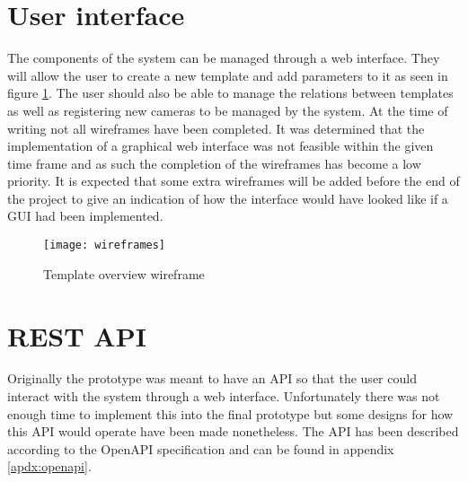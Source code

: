 \section{User interface}
The components of the system can be managed through a web interface.
They will allow the user to create a new template and add parameters to it as seen in figure \ref{fig:templatewireframe}.
The user should also be able to manage the relations between templates as well as registering new cameras to be managed by the system.
At the time of writing not all wireframes have been completed.
It was determined that the implementation of a graphical web interface was not feasible within the given time frame and as such the completion of the wireframes has become a low priority.
It is expected that some extra wireframes will be added before the end of the project to give an indication of how the interface would have looked like if a GUI had been implemented.
\begin{figure}[h!]
	\centering
	\texttt{[image: wireframes]}
	\caption{Template overview  wireframe}
	\label{fig:templatewireframe}
\end{figure}

\section{REST API}
Originally the prototype was meant to have an API so that the user could interact with the system through a web interface.
Unfortunately there was not enough time to implement this into the final prototype but some designs for how this API would operate have been made nonetheless.
The API has been described according to the OpenAPI specification and can be found in appendix \ref{apdx:openapi}.

